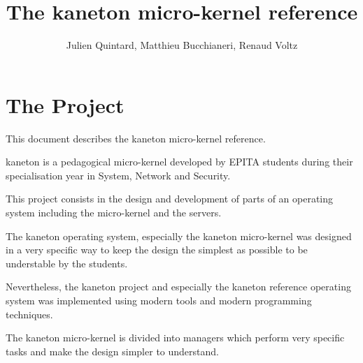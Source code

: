 
%
%



%
%


%
%

\title{The kaneton micro-kernel reference}

%
%

\author{\small{Julien Quintard}, \small{Matthieu Bucchianeri}, \small{Renaud Voltz}}

%
%



%
%

\maketitle

%
%



%
%

\section{The Project}

This document describes the kaneton micro-kernel reference.

kaneton is a pedagogical micro-kernel developed by EPITA students during
their specialisation year in System, Network and Security.

This project consists in the design and development of parts of an
operating system including the micro-kernel and the servers.

The kaneton operating system, especially the kaneton micro-kernel was
designed in a very specific way to keep the design the simplest as possible
to be understable by the students.

Nevertheless, the kaneton project and especially the kaneton reference
operating system was implemented using modern tools and modern
programming techniques.

The kaneton micro-kernel is divided into managers which perform very
specific tasks and make the design simpler to understand.

